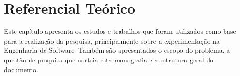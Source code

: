 \chapter{Referencial Teórico}
\label{ch:referencial}

Este capítulo apresenta os estudos e trabalhos que foram utilizados como base para a realização da pesquisa, principalmente sobre a experimentação na Engenharia de Software. Também são apresentados o escopo do problema, a questão de pesquisa que norteia esta monografia e a estrutura geral do documento.

 